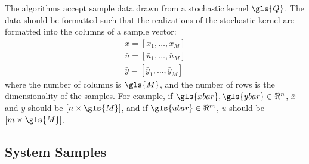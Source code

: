 \documentclass[11pt]{article}
\begin{document}
The algorithms accept sample data drawn from a stochastic kernel $\gls{Q}$. The data should be formatted such that the realizations of the stochastic kernel are formatted into the columns of a sample vector:
\begin{align}
  \bar{x} = [\bar{x}_{1}, \ldots, \bar{x}_{M}] \\
  \bar{u} = [\bar{u}_{1}, \ldots, \bar{u}_{M}] \\
  \bar{y} = [\bar{y}_{1}, \ldots, \bar{y}_{M}]
\end{align}
where the number of columns is $\gls{M}$, and the number of rows is the dimensionality of the samples. For example, if $\gls{xbar}, \gls{ybar} \in \Re^{n}$, $\bar{x}$ and $\bar{y}$ should be $[n \times \gls{M}]$, and if $\gls{ubar} \in \Re^{m}$, $\bar{u}$ should be $[m \times \gls{M}]$.


\subsection{System Samples}
\end{document}
